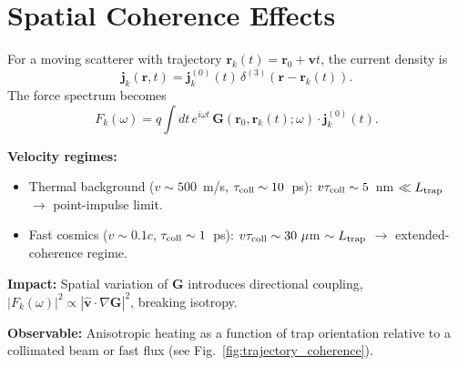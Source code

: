 \section{Spatial Coherence Effects}

\begin{tcolorbox}[title=Fast scatterers: spatial coherence effects]
For a moving scatterer with trajectory 
$\mathbf{r}_k(t)=\mathbf{r}_0+\mathbf{v}t$, 
the current density is
\[
\mathbf{j}_k(\mathbf{r},t) = \mathbf{j}^{(0)}_k(t)\,
\delta^{(3)}(\mathbf{r}-\mathbf{r}_k(t)).
\]
The force spectrum becomes
\[
F_k(\omega) = q \int dt\, e^{i\omega t}\,
\mathbf{G}(\mathbf{r}_0,\mathbf{r}_k(t);\omega)\cdot
\mathbf{j}^{(0)}_k(t).
\]

\textbf{Velocity regimes:}
\begin{itemize}\itemsep0.2em
\item Thermal background ($v \sim 500$~m/s, $\tau_{\rm coll}\sim 10$~ps): 
$v\tau_{\rm coll}\sim 5$~nm $\ll L_{\rm trap}$ $\to$ point-impulse limit.
\item Fast cosmics ($v\sim 0.1c$, $\tau_{\rm coll}\sim 1$~ps): 
$v\tau_{\rm coll}\sim 30~\mu$m $\sim L_{\rm trap}$ $\to$ extended-coherence regime.
\end{itemize}

\textbf{Impact:} Spatial variation of $\mathbf{G}$ introduces directional coupling, 
$|F_k(\omega)|^2 \propto |\hat{\mathbf{v}}\cdot\nabla\mathbf{G}|^2$, 
breaking isotropy. 

\textbf{Observable:} Anisotropic heating as a function of trap orientation relative to a collimated beam or fast flux (see Fig.~\ref{fig:trajectory_coherence}).
\end{tcolorbox}